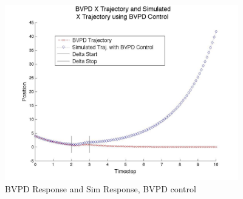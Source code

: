 \documentclass[12pt, notitlepage, letterpaper]{article}
\begin{document}
\begin{figure}[h]
\begin{center}
\includegraphics[width=4in]{BVPDCompare}
\caption{\label{fig:BVPDCompare} BVPD Response and Sim Response, BVPD control}
\end{center}
\end{figure}
\end{document}
